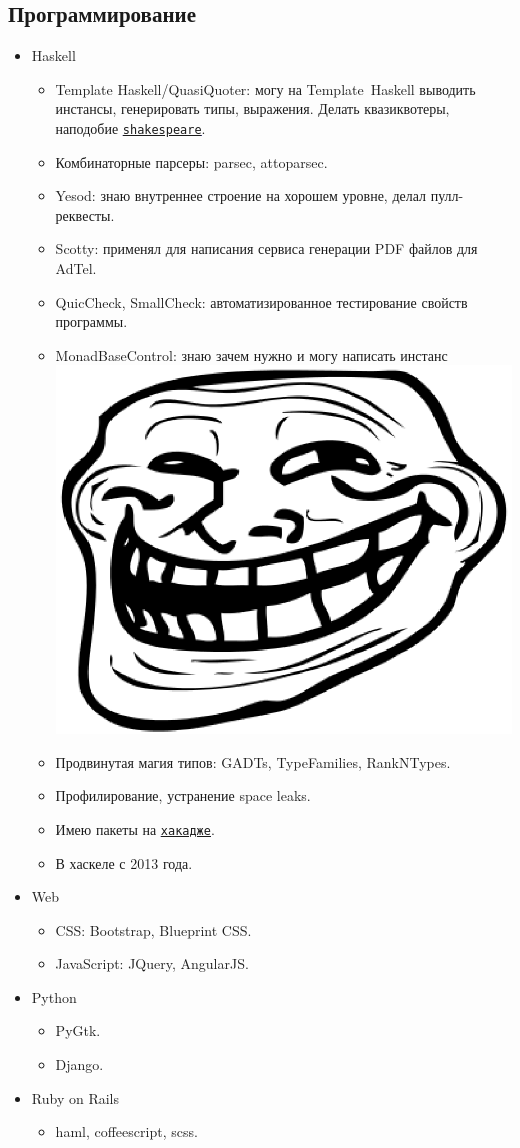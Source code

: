 \documentclass[11pt,a4paper,sans]{moderncv}
\newcommand*{\nlink}[2]{\textcolor{blue}{\texttt{\underline{\href{#1}{#2}}}}}
\begin{document}
\subsection{Программирование}

\begin{itemize}
\item Haskell
  \begin{itemize}
  \item Template Haskell/QuasiQuoter: могу на \hbox{Template Haskell}
    выводить инстансы, генерировать типы, выражения. Делать
    квазиквотеры, наподобие
    \nlink{http://hackage.haskell.org/package/shakespeare}{shakespeare}.
  \item Комбинаторные парсеры: parsec, attoparsec.
  \item Yesod: знаю внутреннее строение на хорошем уровне, делал пулл-реквесты.
  \item Scotty: применял для написания сервиса генерации PDF файлов для AdTel.
  \item QuicCheck, SmallCheck: автоматизированное тестирование свойств
    программы.
  \item MonadBaseControl: знаю зачем нужно и могу написать инстанс
    \includegraphics[height=0.9ex]{Trollface.ps}
  \item Продвинутая магия типов: GADTs, TypeFamilies, RankNTypes.
  \item Профилирование, устранение space leaks.
  \item Имею пакеты на
    \nlink{http://hackage.haskell.org/user/AlekseyUymanov}{хакадже}.
  \item В хаскеле с 2013 года.
  \end{itemize}
\item Web
  \begin{itemize}
  \item CSS: Bootstrap, Blueprint CSS.
  \item JavaScript: JQuery, AngularJS.
  \end{itemize}
\item Python
  \begin{itemize}
  \item PyGtk.
  \item Django.
  \end{itemize}
\item Ruby on Rails
  \begin{itemize}
  \item haml, coffeescript, scss.

\end{itemize}
\end{itemize}
\end{document}
